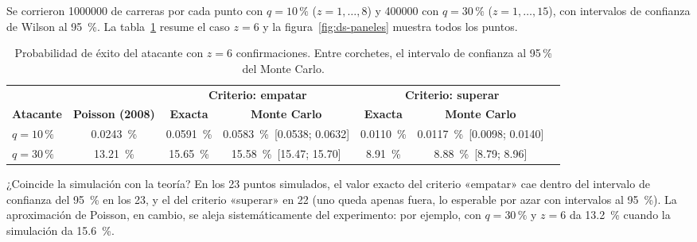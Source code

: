 \documentclass[11pt,a4paper]{article}
\newcommand{\webhint}[1]{}
\begin{document}
Se corrieron \num{1000000} de carreras por cada punto con $q=10\,\%$ ($z=1,\dots,8$) y \num{400000} con $q=30\,\%$ ($z=1,\dots,15$), con intervalos de confianza de Wilson al \SI{95}{\percent}. La tabla~\ref{tab:z6} resume el caso $z=6$ y la figura~\ref{fig:ds-paneles} muestra todos los puntos.

\begin{table}[tbp]
\centering
\webhint{table; id=tab-z6; kind=comparison; data=data/double_spend_mc.csv; filter=z=6}
\small
\setlength{\tabcolsep}{4pt}
\renewcommand{\arraystretch}{1.25}
\begin{tabular}{@{}l c c c c c c@{}}
\toprule
 & & \multicolumn{2}{c}{\textbf{Criterio: empatar}} & \multicolumn{2}{c}{\textbf{Criterio: superar}} \\
\cmidrule(lr){3-4}\cmidrule(lr){5-6}
\textbf{Atacante} & \textbf{Poisson (2008)} & \textbf{Exacta} & \textbf{Monte Carlo} & \textbf{Exacta} & \textbf{Monte Carlo}\\
\midrule
$q=10\,\%$ & \SI{0.0243}{\percent} & \SI{0.0591}{\percent} & \SI{0.0583}{\percent}\ {\scriptsize[0.0538; 0.0632]} & \SI{0.0110}{\percent} & \SI{0.0117}{\percent}\ {\scriptsize[0.0098; 0.0140]}\\
$q=30\,\%$ & \SI{13.21}{\percent} & \SI{15.65}{\percent} & \SI{15.58}{\percent}\ {\scriptsize[15.47; 15.70]} & \SI{8.91}{\percent} & \SI{8.88}{\percent}\ {\scriptsize[8.79; 8.96]}\\
\bottomrule
\end{tabular}
\caption{Probabilidad de éxito del atacante con $z=6$ confirmaciones. Entre corchetes, el intervalo de confianza al 95\,\% del Monte Carlo.}\label{tab:z6}
\end{table}

\begin{verificacion}{¿Coincide la simulación con la teoría?}\label{ver:mc}
En los 23 puntos simulados, el valor exacto del criterio «empatar» cae dentro del intervalo de confianza del \SI{95}{\percent} en los 23, y el del criterio «superar» en 22 (uno queda apenas fuera, lo esperable por azar con intervalos al \SI{95}{\percent}). La aproximación de Poisson, en cambio, se aleja sistemáticamente del experimento: por ejemplo, con $q=30\,\%$ y $z=6$ da \SI{13.2}{\percent} cuando la simulación da \SI{15.6}{\percent}.
\end{verificacion}
\end{document}
